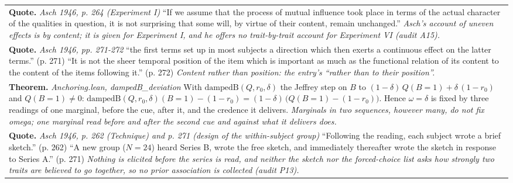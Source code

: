 \documentclass[10pt]{article}
\theoremstyle{definition}
\newlength{\fullw}\setlength{\fullw}{25.9cm}
\begin{document}
{\begin{longtable}{|p{0.9cm}|p{12.2cm}|p{12.2cm}|}
\multicolumn{3}{|p{\fullw}|}{\textbf{Quote.} \textit{Asch 1946, p. 264 (Experiment I)} \newline ``If we assume that the process of mutual influence took place in terms of the actual character of the qualities in question, it is not surprising that some will, by virtue of their content, remain unchanged.'' \newline \textit{Asch's account of uneven effects is by content; it is given for Experiment I, and he offers no trait-by-trait account for Experiment VI (audit A15).}} \\
\multicolumn{3}{|p{\fullw}|}{\textbf{Quote.} \textit{Asch 1946, pp. 271-272} \newline ``the first terms set up in most subjects a direction which then exerts a continuous effect on the latter terms.'' (p. 271) ``It is not the sheer temporal position of the item which is important as much as the functional relation of its content to the content of the items following it.'' (p. 272) \newline \textit{Content rather than position: the entry's ``rather than to their position''.}} \\
\multicolumn{3}{|p{\fullw}|}{\textbf{Theorem.} \textit{Anchoring.lean, dampedB\_deviation} \newline With $\mathrm{dampedB}(Q,r_0,\delta)$ the Jeffrey step on $B$ to $(1-\delta)\,Q(B{=}1) + \delta\,(1-r_0)$ and $Q(B{=}1) \neq 0$: $\mathrm{dampedB}(Q,r_0,\delta)(B{=}1) - (1-r_0) = (1-\delta)\,\big(Q(B{=}1) - (1-r_0)\big)$. Hence $\omega = \delta$ is fixed by three readings of one marginal, before the cue, after it, and the credence it delivers. \newline \textit{Marginals in two sequences, however many, do not fix omega; one marginal read before and after the second cue and against what it delivers does.}} \\
\multicolumn{3}{|p{\fullw}|}{\textbf{Quote.} \textit{Asch 1946, p. 262 (Technique) and p. 271 (design of the within-subject group)} \newline ``Following the reading, each subject wrote a brief sketch.'' (p. 262) ``A new group ($N{=}24$) heard Series B, wrote the free sketch, and immediately thereafter wrote the sketch in response to Series A.'' (p. 271) \newline \textit{Nothing is elicited before the series is read, and neither the sketch nor the forced-choice list asks how strongly two traits are believed to go together, so no prior association is collected (audit P13).}} \\ \hline

\end{longtable}}
\end{document}
